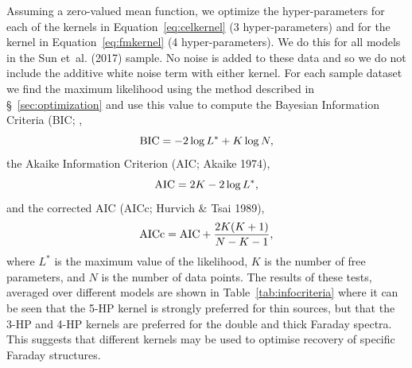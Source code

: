 \documentclass[fleqn,usenatbib]{mnras}
\begin{document}
Assuming a zero-valued mean function, we optimize the hyper-parameters for each of the kernels in Equation~\ref{eq:celkernel} (3 hyper-parameters) and for the kernel in Equation~\ref{eq:fmkernel} (4 hyper-parameters). We do this for all models in the Sun et~al. (2017) sample. No noise is added to these data and so we do not include the additive white noise term with either kernel. For each sample dataset we find the maximum likelihood using the method described in \S~\ref{sec:optimization} and use this value to compute the Bayesian Information Criteria (BIC; \citep{1978AnSta...6..461S},
%
\begin{equation}
{\rm BIC} = -2 \log L^\ast + K \log N,
\end{equation}
%
the Akaike Information Criterion (AIC; Akaike 1974),
%
\begin{equation}
{\rm AIC} = 2 K - 2\log L^\ast,
\end{equation}
%
and the corrected AIC (AICc; Hurvich \& Tsai 1989),
%
\begin{equation}
{\rm AICc} = {\rm AIC} + \frac{2K(K+1)}{N - K - 1},
\end{equation}
%
where $L^\ast$ is the maximum value of the likelihood, $K$ is the number of free parameters, and $N$ is the number of data points. The results of these tests, averaged over different models are shown in Table~\ref{tab:infocriteria} where it can be seen that the 5-HP kernel is strongly preferred for thin sources, but that the 3-HP and 4-HP kernels are preferred for the double and thick Faraday spectra. This suggests that different kernels may be used to optimise recovery of specific Faraday structures. 
%
\end{document}
